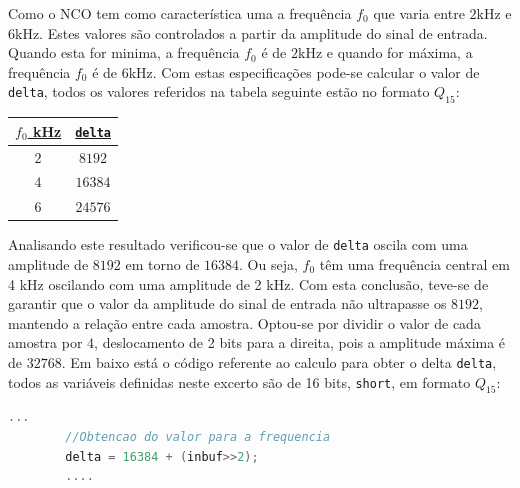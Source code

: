 \documentclass[11pt]{article}
\numberwithin{equation}{section}
\begin{document}
Como o NCO tem como característica uma a frequência $f_{0}$ que varia entre $2$kHz e $6$kHz. Estes valores são controlados a partir da amplitude do sinal de entrada. Quando esta for minima, a frequência $f_{0}$ é de $2$kHz e quando for máxima, a frequência $f_{0}$ é de $6$kHz. Com estas especificações pode-se calcular o valor de \texttt{delta}, todos os valores referidos na tabela seguinte estão no formato $Q_{15}$:

\begin{table}[h]
	\centering
	\begin{tabular}{|c|c|}
		\hline
	\underline{$f_{0}$ kHz} &\underline{\texttt{delta}} \\ \hline
		$2$ & $8192$  \\ \hline
		$4$ & $16384$ \\ \hline
		$6$ & $24576$ \\ \hline
	\end{tabular}
\end{table}

Analisando este resultado verificou-se que o valor de \texttt{delta} oscila com uma amplitude de $8192$ em torno de $16384$. Ou seja, $f_{0}$ têm uma frequência central em 4 kHz oscilando com uma amplitude de 2 kHz. Com esta conclusão, teve-se de garantir que o valor da amplitude do sinal de entrada não ultrapasse os $8192$, mantendo a relação entre cada amostra. Optou-se por dividir o valor de cada amostra por $4$, deslocamento de 2 bits para a direita, pois a amplitude máxima é de $32768$. Em baixo está o código referente ao calculo  para obter o delta \texttt{delta}, todos as variáveis definidas neste excerto são de 16 bits, \texttt{short}, em formato $Q_{15}$:

\begin{lstlisting}[language=C]
		...	
		//Obtencao do valor para a frequencia		
		delta = 16384 + (inbuf>>2); 
		....
\end{lstlisting}



\subsection{} %


\subsection{} %

\end{document}
